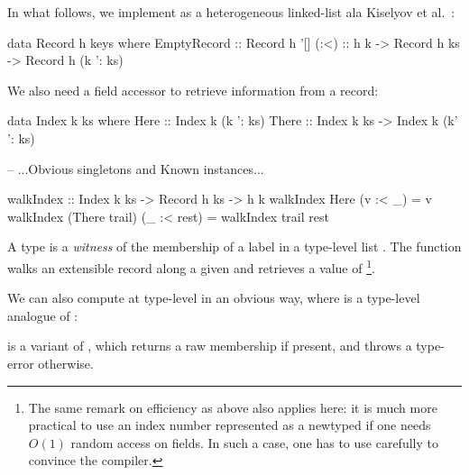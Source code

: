 \documentclass[demotion-paper.tex]{subfiles}
\begin{document}
In what follows, we implement  as a heterogeneous linked-list ala Kiselyov et al.~\cite{Kiselyov:2004zz}\footnotemark:
\begin{code}
data Record h keys where
  EmptyRecord :: Record h '[]
  (:<) :: h k -> Record h ks -> Record h (k ': ks)
\end{code}
We also need a field accessor to retrieve information from a record:
\begin{code}
data Index k ks where
  Here  :: Index k (k ': ks)
  There :: Index k ks -> Index k (k' ': ks)

-- ...Obvious singletons and Known instances...

walkIndex :: Index k ks -> Record h ks -> h k
walkIndex Here (v :< _) = v
walkIndex (There trail) (_ :< rest) = 
  walkIndex trail rest  
\end{code}
A type  is a \emph{witness} of the membership of a label  in a type-level list .
The function  walks an extensible record along a given  and retrieves a value of \footnote{The same remark on efficiency as above also applies here: it is much more practical to use an index number represented as a newtyped  if one needs $O(1)$ random access on fields.
In such a case, one has to use  carefully to convince the compiler.}.

We can also compute  at type-level in an obvious way, where \haskinline{(<$>)} is a type-level analogue of \hask{(<$>)}:
 is a variant of , which returns a raw membership if present, and throws a type-error otherwise.
\end{document}
